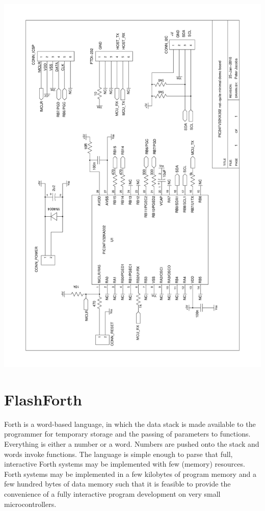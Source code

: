 \documentclass[12pt,a4paper]{article}
\begin{document}
\newpage
\noindent
\includegraphics[width=\textwidth,angle=0,viewport=48 37 547 806]{../figs/demo-board-schematic-32ka302.pdf}



\bigskip
\section{FlashForth}
%
Forth is a word-based language, in which the data stack is made available to the programmer
for temporary storage and the passing of parameters to functions.
Everything is either a number or a word.
Numbers are pushed onto the stack and words invoke functions.
The language is simple enough to parse that full, interactive Forth systems may be implemented 
with few (memory) resources.
Forth systems may be implemented in a few kilobytes of program memory and a few hundred bytes
of data memory such that it is feasible to provide the convenience of a fully interactive
program development on very small microcontrollers.
\end{document}
